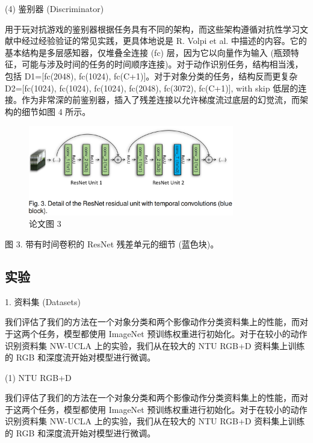 (4) 鉴别器 (Discriminator) 

用于玩对抗游戏的鉴别器根据任务具有不同的架构，而这些架构遵循对抗性学习文献中经过经验验证的常见实践，更具体地说是 R. Volpi et al. 中描述的内容。它的基本结构是多层感知器，仅堆叠全连接 (fc) 层，因为它以向量作为输入 (瓶颈特征，可能与涉及时间的任务的时间顺序连接)。对于动作识别任务，结构相当浅，包括 D1=[fc(2048), fc(1024), fc(C+1)]。对于对象分类的任务，结构反而更复杂 D2=[fc(1024), fc(1024), fc(1024), fc(2048), fc(3072), fc(C+1)], with skip 低层的连接。作为非常深的前鉴别器，插入了残差连接以允许梯度流过底层的幻觉流，而架构的细节如图 4 所示。

\begin{figure}[htb]
\centering 
\includegraphics[width=0.80\textwidth]{img/c1m3.png} 
\caption{论文图 3}
\label{Test}
\end{figure}

图 3. 带有时间卷积的 ResNet 残差单元的细节 (蓝色块)。

\subsection{实验}

1. 资料集 (Datasets) 

我们评估了我们的方法在一个对象分类和两个影像动作分类资料集上的性能，而对于这两个任务，模型都使用 ImageNet 预训练权重进行初始化。对于在较小的动作识别资料集 NW-UCLA 上的实验，我们从在较大的 NTU RGB+D 资料集上训练的 RGB 和深度流开始对模型进行微调。

(1) NTU RGB+D

我们评估了我们的方法在一个对象分类和两个影像动作分类资料集上的性能，而对于这两个任务，模型都使用 ImageNet 预训练权重进行初始化。对于在较小的动作识别资料集 NW-UCLA 上的实验，我们从在较大的 NTU RGB+D 资料集上训练的 RGB 和深度流开始对模型进行微调。

